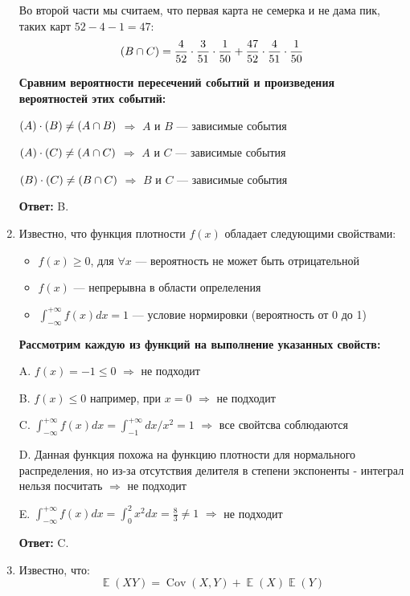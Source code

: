 \documentclass[a4paper]{article} %
\DeclareMathOperator{\Cov}{Cov}
\DeclareMathOperator{\E}{\mathbb{E}}
\let\P\relax
\DeclareMathOperator{\P}{\mathbb{P}}
\renewcommand{\le}{\leqslant}
\renewcommand{\ge}{\geqslant}
\begin{document}
\begin{enumerate}
    Во второй части мы считаем, что первая карта не семерка и не дама пик, таких карт $52-4-1=47$:
    \[ \P(B \cap C) = \frac{4}{52}\cdot\frac{3}{51}\cdot\frac{1}{50} + \frac{47}{52}\cdot\frac{4}{51}\cdot\frac{1}{50} \] 
    
    \textbf{Сравним вероятности пересечений событий и произведения вероятностей этих событий:}
    
    $ \P(A) \cdot \P(B) \neq \P(A \cap B) $ $\Rightarrow$ $A$ и $B$ — зависимые события
    
    $ \P(A) \cdot \P(C) \neq \P(A \cap C) $ $\Rightarrow$ $A$ и $C$ — зависимые события
    
    $ \P(B) \cdot \P(C) \neq \P(B \cap C) $ $\Rightarrow$ $B$ и $C$ — зависимые события
    
    \textbf{Ответ:} B.
    
    
    \item
    Известно, что функция плотности $f(x)$ обладает следующими свойствами:
    \begin{itemize}
        \item $f(x) \ge 0$, для $ \forall x$ — вероятность не может быть отрицательной
        \item $f(x)$ — непрерывна в области опрелеления
        \item $ \int_{-\infty}^{+\infty} f(x) dx = 1$ — условие нормировки (вероятность от 0 до 1)
    \end{itemize}
    
    \textbf{Рассмотрим каждую из функций на выполнение указанных свойств:}
    
    A. $f(x) = -1 \le 0$ $\Rightarrow$ не подходит
    
    B. $f(x) \le 0$ например, при $x = 0$ $\Rightarrow$ не подходит
    
    C. $ \int_{-\infty}^{+\infty} f(x) dx = \int_{-1}^{+\infty} dx/x^2 = 1 $ $\Rightarrow$ все свойтсва соблюдаются
    
    D. Данная функция похожа на функцию плотности для нормального распределения, но из-за отсутствия делителя в степени экспоненты - интеграл нельзя посчитать $\Rightarrow$ не подходит
    
    E. $ \int_{-\infty}^{+\infty} f(x) dx = \int_{0}^{2} x^2 dx = \frac{8}{3} \neq 1 $ $\Rightarrow$ не подходит
    
    \textbf{Ответ:} C.
    
    
    \item
    Известно, что:
    \[\E(XY) = \Cov(X,Y) + \E(X)\E(Y)\]
    

\end{enumerate}
\end{document}
